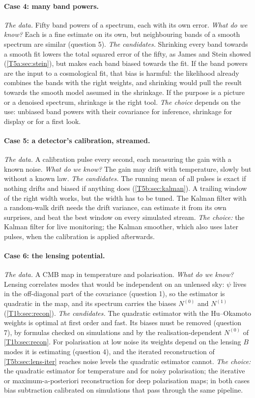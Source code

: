 \paragraph{Case 4: many band powers.}
\emph{The data.} Fifty band powers of a spectrum, each with its own error.
\emph{What do we know?} Each is a fine estimate on its own, but neighbouring
bands of a smooth spectrum are similar (question 5). \emph{The candidates.}
Shrinking every band towards a smooth fit lowers the total squared error of
the fifty, as James and Stein showed (\cref{T5a:sec:stein}), but makes each
band biased towards the fit. If the band powers are the input to a
cosmological fit, that bias is harmful: the likelihood already combines the
bands with the right weights, and shrinking would pull the result towards
the smooth model assumed in the shrinkage. If the purpose is a picture or a
denoised spectrum, shrinkage is the right tool. \emph{The choice} depends on
the use: unbiased band powers with their covariance for inference,
shrinkage for display or for a first look.

\paragraph{Case 5: a detector's calibration, streamed.}
\emph{The data.} A calibration pulse every second, each measuring the gain
with a known noise. \emph{What do we know?} The gain may drift with
temperature, slowly but without a known law. \emph{The candidates.} The
running mean of all pulses is exact if nothing drifts and biased if anything
does (\cref{T5b:sec:kalman}). A trailing window of the right width works,
but the width has to be tuned. The Kalman filter with a random-walk drift
needs the drift variance, can estimate it from its own surprises, and beat
the best window on every simulated stream. \emph{The choice:} the Kalman filter
for live monitoring; the Kalman smoother, which also uses later pulses, when
the calibration is applied afterwards.

\paragraph{Case 6: the lensing potential.}
\emph{The data.} A CMB map in temperature and polarisation. \emph{What do we
know?} Lensing correlates modes that would be independent on an unlensed
sky: $\psi$ lives in the off-diagonal part of the covariance (question 1), so
the estimator is quadratic in the map, and its spectrum carries the biases
$N^{(0)}$ and $N^{(1)}$ (\cref{T1b:sec:recon}). \emph{The candidates.} The
quadratic estimator with the Hu--Okamoto weights is optimal at first order
and fast. Its biases must be removed (question 7), by formulas checked on
simulations and by the realisation-dependent $N^{(0)}$ of \cref{T1b:sec:recon}. For polarisation at low
noise its weights depend on the lensing $B$ modes it is estimating
(question 4), and the iterated reconstruction of \cref{T5b:sec:lens-iter}
reaches noise levels the quadratic estimator cannot. \emph{The choice:} the
quadratic estimator for temperature and for noisy polarisation; the
iterative or maximum-a-posteriori reconstruction for deep polarisation
maps; in both cases bias subtraction calibrated on simulations that pass
through the same pipeline.

